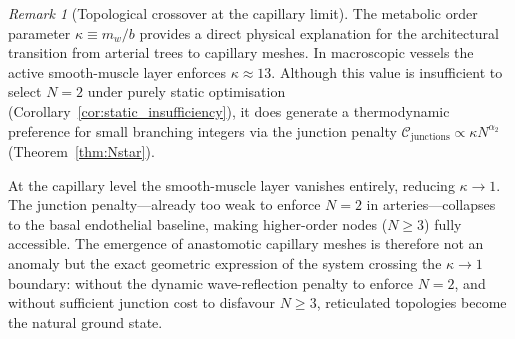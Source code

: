 \documentclass[11pt,a4paper]{article}
\theoremstyle{remark}
\newtheorem{remark}{Remark}
\begin{document}
\begin{remark}[Topological crossover at the capillary limit]
\label{rem:capillary_crossover}
The metabolic order parameter $\kappa \equiv m_w / b$ provides a direct
physical explanation for the architectural transition from arterial trees
to capillary meshes. In macroscopic vessels the active smooth-muscle
layer enforces $\kappa \approx 13$. Although this value is insufficient
to select $N=2$ under purely static optimisation
(Corollary~\ref{cor:static_insufficiency}), it does generate a
thermodynamic preference for small branching integers via the junction
penalty $\mathcal{C}_{\mathrm{junctions}} \propto \kappa N^{\alpha_2}$
(Theorem~\ref{thm:Nstar}).

At the capillary level the smooth-muscle layer vanishes entirely,
reducing $\kappa \to 1$. The junction penalty---already too weak to
enforce $N=2$ in arteries---collapses to the basal endothelial
baseline, making higher-order nodes ($N \geq 3$) fully accessible.
The emergence of anastomotic capillary meshes is therefore not an
anomaly but the exact geometric expression of the system crossing the
$\kappa \to 1$ boundary: without the dynamic wave-reflection penalty
to enforce $N=2$, and without sufficient junction cost to disfavour
$N \geq 3$, reticulated topologies become the natural ground state.
\end{remark}
\end{document}
